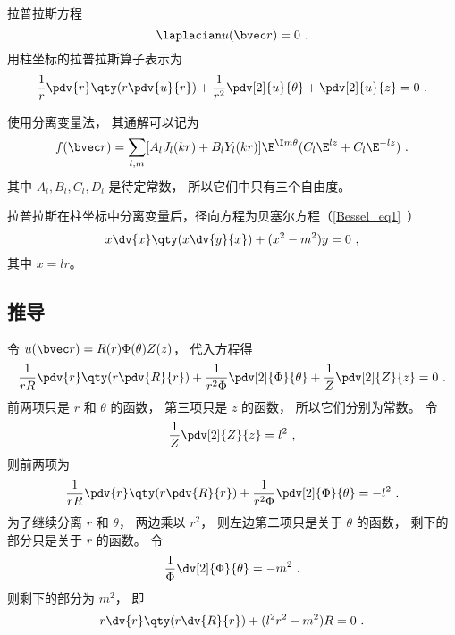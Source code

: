 

拉普拉斯方程
\begin{equation}
\laplacian u(\bvec r) = 0~.
\end{equation}
用柱坐标的拉普拉斯算子表示为
\begin{equation}
\frac{1}{r}\pdv{r}\qty(r \pdv{u}{r}) + \frac{1}{r^2} \pdv[2]{u}{\theta} + \pdv[2]{u}{z} = 0~.
\end{equation}

使用分离变量法， 其通解可以记为
\begin{equation}
f(\bvec r) = \sum_{l,m} [A_l J_l(kr) + B_l Y_l(kr)]\E^{\I m \theta} (C_l\E^{lz} + C_l \E^{-lz})~.
\end{equation}
其中 $A_l, B_l, C_l, D_l$ 是待定常数， 所以它们中只有三个自由度。

拉普拉斯在柱坐标中分离变量后，径向方程为贝塞尔方程（\autoref{Bessel_eq1}~）
\begin{equation}
x \dv{x} \qty(x \dv{y}{x}) + (x^2 - m^2)y = 0~,
\end{equation}
其中 $x = lr$。

\subsection{推导}
令 $u(\bvec r) = R(r) \Phi(\theta) Z(z)$， 代入方程得
\begin{equation}
\frac{1}{rR}\pdv{r} \qty(r\pdv{R}{r}) + \frac{1}{r^2 \Phi} \pdv[2]{\Phi}{\theta} + \frac{1}{Z} \pdv[2]{Z}{z} = 0~.
\end{equation}
前两项只是 $r$ 和 $\theta $ 的函数， 第三项只是 $z$ 的函数， 所以它们分别为常数。 令
\begin{equation}\label{CylLap_eq4}
\frac{1}{Z} \pdv[2]{Z}{z} = l^2~,
\end{equation}
则前两项为
\begin{equation}
\frac{1}{rR} \pdv{r} \qty(r\pdv{R}{r}) + \frac{1}{r^2 \Phi} \pdv[2]{\Phi}{\theta} =  - l^2~.
\end{equation}
为了继续分离 $r$ 和 $\theta$， 两边乘以 $r^2$，   则左边第二项只是关于 $\theta$  的函数， 剩下的部分只是关于 $r$ 的函数。 令
\begin{equation}\label{CylLap_eq6}
\frac{1}{\Phi } \dv[2]{\Phi}{\theta} = -m^2~.
\end{equation}
则剩下的部分为 $m^2$， 即
\begin{equation}\label{CylLap_eq7}
r \dv{r} \qty(r\dv{R}{r}) + (l^2 r^2 - m^2)R = 0~.
\end{equation}


